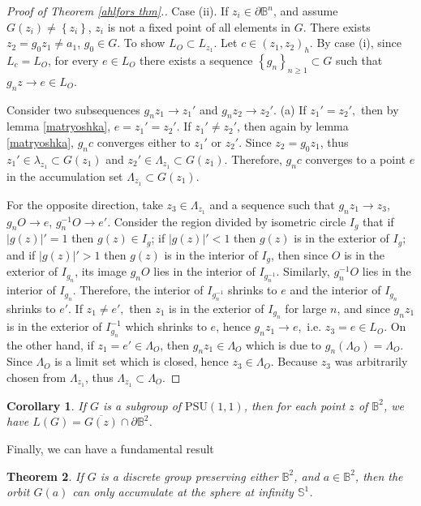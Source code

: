 \documentclass[12pt,oneside]{sfsuthesis}
\theoremstyle{plain} %
\newtheorem{theorem}{Theorem}[chapter]
\newtheorem{corollary}[theorem]{Corollary}
\theoremstyle{definition}  %
\theoremstyle{remark}  %
\theoremstyle{plain}
\begin{document}
{\begin{proof}[Proof of Theorem \ref{ahlfors thm}.\cite{ahlfors1981mobius, ratcliffe1994foundations, dal2010geodesic}]
Case (ii). If $z_i\in \partial \mathbb{B}^n$, and assume $G(z_i)\neq \left\lbrace z_i\right\rbrace$, $z_i$ is not a fixed point of all elements in $G$. There exists $z_2=g_0z_1\neq a_1$, $g_0\in G$. To show $L_O\subset L_{z_1}$. Let $c\in (z_1,z_2)_h$. By case (i), since $L_c=L_O$, for every $e\in L_O$ there exists a sequence $\left\lbrace g_n\right\rbrace_{n\geq 1}\subset G$ such that $g_nz\to e\in L_{O}$. 

Consider two subsequences $g_nz_1\to z_1'$ and $g_nz_2 \to z_2'.$ (a) If $z_1'=z_2',$ then by lemma \ref{matryoshka}, $e=z_1'=z_2'.$ If $z_1'\neq z_2'$, then again by lemma \ref{matryoshka}, $g_nc$ converges either to $z_1'$ or $z_2'$. Since $z_2=g_0z_1$, thus $z_1'\in \lambda_{z_1}\subset G(z_1)$ and $z_2'\in \Lambda_{z_1}\subset G(z_1)$. Therefore, $g_nc$ converges to a point $e$ in the accumulation set $\Lambda_{z_1}\subset G(z_1)$.

For the opposite direction, take $z_3\in \Lambda_{z_1}$ and a sequence such that $g_nz_1\to z_3$, $g_nO\to e$, $g_n^{-1}O\to e'.$ Consider the region divided by isometric circle $I_g$ that if $\vert g(z) \vert'=1$ then $g(z)\in I_g$; if $\vert g(z) \vert'<1$ then $g(z)$ is in the exterior of $I_g$; and if $\vert g(z) \vert'>1$ then $g(z)$ is in the interior of $I_g$, then since $O$ is in the exterior of $I_{g_n}$, its image $g_nO$ lies in the interior of $I_{g_{n}^{-1}}$. Similarly, $g_n^{-1}O$ lies in the interior of $I_{g_{n}}$. Therefore, the interior of $I_{g_n^{-1}}$ shrinks to $e$ and the interior of $I_{g_n}$ shrinks to $e'$. If $z_1\neq e',$ then $z_1$ is in the exterior of $I_{g_{n}}$ for large $n$, and since $g_nz_1$ is in the exterior of $I_{g_n}^{-1}$ which shrinks to $e$, hence $g_nz_1\to e,$ i.e. $z_3=e\in L_O.$ On the other hand, if $z_1=e'\in \Lambda_O$, then $g_nz_1\in \Lambda_O$ which is due to $g_n(\Lambda_O)=\Lambda_O$. Since $\Lambda_O$ is a limit set which is closed, hence $z_3\in \Lambda_O.$ Because $z_3$ was arbitrarily chosen from $\Lambda_{z_1}$, thus $\Lambda_{z_1}\subset \Lambda_O$.

\end{proof}
\begin{corollary}
If $G$ is a subgroup of $\text{PSU}(1,1)$, then for each point $z$ of $\mathbb{B}^2$, we have $L(G)=\overline{G(z)}\cap \partial \mathbb{B}^2$.
\end{corollary}


Finally, we can have a fundamental result
\begin{theorem}\label{fundamental}
If $G$ is a discrete group preserving either $\mathbb{B}^2$, and $a\in \mathbb{B}^2$, then the orbit $G(a)$ can only accumulate at the sphere at infinity $\mathbb{S}^{1}$.
\end{theorem}

}
\end{document}
